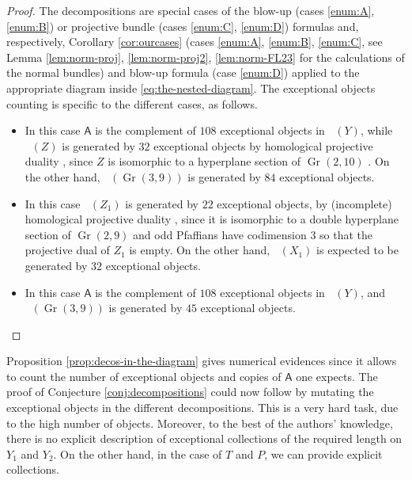 \documentclass[JEP,XML,SOM,Unicode,NoEqCountersInSection]{cedram}
\theoremstyle{plain}
\theoremstyle{definition}
\newcommand{\cat}[1]{\mathsf{#1}}
\DeclareMathOperator{\Db}{{\cat{D}^{\mathrm{b}}}}
\DeclareMathOperator{\Gr}{Gr}
\begin{document}
\begin{proof}
The decompositions are special cases of the blow-up (cases \eqref{enum:A}, \eqref{enum:B}) or projective bundle (cases \eqref{enum:C}, \eqref{enum:D}) formulas and, respectively,
Corollary \ref{cor:ourcases} (cases \eqref{enum:A}, \eqref{enum:B}, \eqref{enum:C}, see Lemma \ref{lem:norm-proj}, \ref{lem:norm-proj2}, \ref{lem:norm-FL23} for the calculations
of the normal bundles) and blow-up formula (case \eqref{enum:D}) applied to the appropriate diagram inside
\eqref{eq:the-nested-diagram}.
The exceptional objects counting is specific to the different cases, as follows.

\begin{itemize}

\item[\eqref{enum:A}] In this case $\cat{A}$ is the complement of $108$ exceptional objects
in $\Db(Y)$, while $\Db(Z)$ is generated by $32$ exceptional objects by homological projective
duality \cite[Th.\,4.33]{rennemo-segal}, since $Z$ is isomorphic to a hyperplane
section of $\Gr(2,10)$ . On the other hand, $\Db(\Gr(3,9))$ is generated
by $84$ exceptional objects.

\item[\eqref{enum:B}] In this case $\Db(Z_1)$ is generated by $22$ exceptional objects,
by (incomplete) homological projective duality \cite[Th.\,4.33]{rennemo-segal},
since it is isomorphic to a double hyperplane
section of $\Gr(2,9)$ and odd Pfaffians have codimension
3 so that the projective dual of $Z_1$ is empty. On the other hand, $\Db(X_1)$ is
expected to be generated by $32$ exceptional objects.

\item[\eqref{enum:C}] In this case $\cat{A}$ is the complement of $108$ exceptional objects
in $\Db(Y)$, and $\Db(\Gr(3,9))$ is generated
by $45$ exceptional objects.\qedhere
\end{itemize}
\end{proof}

Proposition \ref{prop:decos-in-the-diagram} gives numerical evidences since it allows to count the
number of exceptional objects and copies of $\cat{A}$ one expects. The proof of Conjecture
\ref{conj:decompositions} could now follow by mutating the exceptional objects in the different decompositions.
This is a very hard task, due to the high number of objects. Moreover, to the best of
the authors' knowledge,
there is no explicit description of exceptional collections of the required length on $Y_1$ and $Y_2$.
On the other hand, in the case of $T$ and $P$, we can provide explicit collections.
\end{document}

